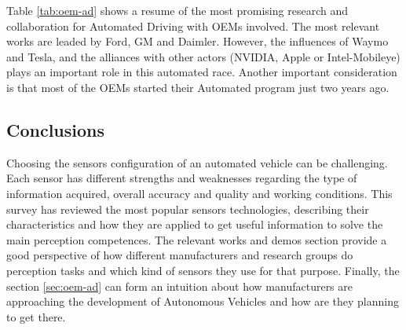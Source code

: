 Table \ref{tab:oem-ad} shows a resume of the most promising research and 
collaboration for Automated Driving with OEMs involved. The most relevant works 
are leaded by Ford, GM and Daimler. However, the influences of Waymo and Tesla, 
and the alliances with other actors (NVIDIA, Apple or Intel-Mobileye) plays an
important role in this automated race. Another important consideration is that 
most of the OEMs started their Automated program just two years ago.

\subsection{Conclusions}

Choosing the sensors configuration of an automated vehicle can be challenging.
Each sensor has different strengths and weaknesses regarding
the type of information acquired, overall accuracy and quality and working conditions. 
This survey has reviewed the most popular sensors technologies, 
describing their characteristics and how they are applied to get useful information 
to solve the main perception competences.
The relevant works and demos section provide a good perspective of how different 
manufacturers and research groups do perception tasks and which kind of sensors 
they use for that purpose. 
Finally, the section \ref{sec:oem-ad} can form an intuition about how
manufacturers are approaching the development of Autonomous Vehicles
and how are they planning to get there.


